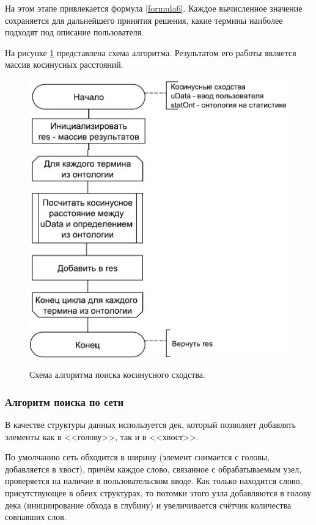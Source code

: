 На этом этапе привлекается формула \ref{formula6}. Каждое вычисленное значение сохраняется для дальнейшего принятия решения, какие термины наиболее подходят под описание пользователя.

На рисунке \ref{fig35:image} представлена схема алгоритма. Результатом его работы является массив косинусных расстояний. 

\begin{figure}[h]
	\begin{center}
		{\includegraphics[scale = 0.6]{img/schemes/pdf/cos.pdf}}
		\caption{Схема алгоритма поиска косинусного сходства.}
		\label{fig35:image}
	\end{center}
\end{figure}

\subsubsection{Алгоритм поиска по сети}
В качестве структуры данных используется дек, который позволяет добавлять элементы как в <<голову>>, так и в <<хвост>>. 

По умолчанию сеть обходится в ширину (элемент снимается с головы, добавляется в хвост), причём каждое слово, связанное с обрабатываемым узел, проверяется на наличие в пользовательском вводе. Как только находится слово, присутствующее в обеих структурах, то потомки этого узла добавляются в голову дека (инициирование обхода в глубину) и увеличивается счётчик количества совпавших  слов.

